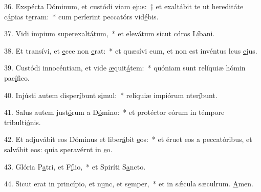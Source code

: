 36. Exspécta Dóminum, et custódi viam \uline{e}jus:~† et exaltábit te ut hereditáte c\uline{á}pias t\uline{e}rram:~* cum períerint peccatórs vid\uline{é}bis.\par 
37. Vidi ímpium super\uline{e}xalt\uline{á}tum,~* et elevátum sicut cdros L\uline{í}bani.\par 
38. Et transívi, et \uline{e}cce non \uline{e}rat:~* et quæsívi eum, et non est invéntus lcus \uline{e}jus.\par 
39. Custódi innocéntiam, et vide \uline{æ}quit\uline{á}tem:~* quóniam sunt relíquiæ hómin pac\uline{í}fico.\par 
40. Injústi autem disper\uline{í}bunt s\uline{i}mul:~* relíquiæ impiórum nter\uline{í}bunt.\par 
41. Salus autem just\uline{ó}rum a D\uline{ó}mino:~* et protéctor eórum in témpore tribulti\uline{ó}nis.\par 
42. Et adjuvábit eos Dóminus et liber\uline{á}bit \uline{e}os:~* et éruet eos a peccatóribus, et salvábit eos: quia speravérnt in \uline{e}o.\par 
43. Glória P\uline{a}tri, et F\uline{í}lio,~* et Spiríti S\uline{a}ncto.\par 
44. Sicut erat in princípio, et n\uline{u}nc, et s\uline{e}mper,~* et in sǽcula sæculrum. \uline{A}men.\par 
